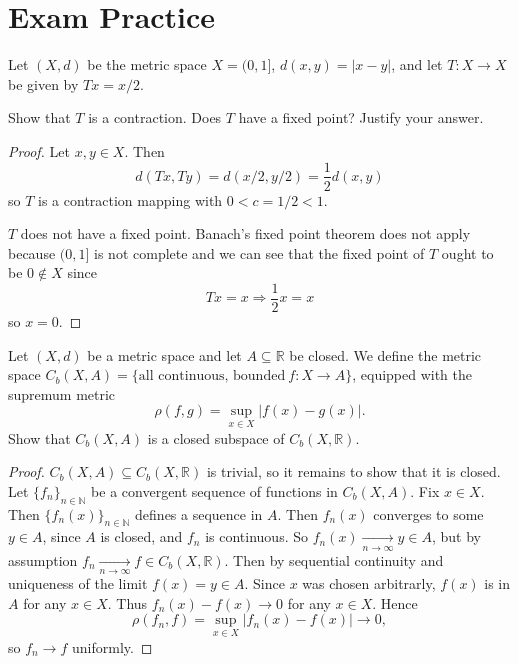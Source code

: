\newpage 
\section{Exam Practice}

\begin{prob}[1 Exam 2021]
    Let $(X,d)$ be the metric space $X = (0,1]$, $d(x,y) = |x-y|$, 
    and let $T : X \to X$ be given by $Tx = x/2$.

    Show that $T$ is a contraction. Does $T$ have a fixed point? 
    Justify your answer.
\end{prob}
\begin{proof}
    Let $x,y \in X$. Then 
    \[ 
        d(Tx,Ty) = d(x/2, y/2) = \frac{1}{2}d(x,y)
    \]
    so $T$ is a contraction mapping with $0 < c = 1/2 < 1$.

    $T$ does not have a fixed point. Banach's fixed point theorem 
    does not apply because $(0,1]$ is not complete and we can 
    see that the fixed point of $T$ ought to be $0 \not\in X$ since 
    \[
        Tx = x \Rightarrow \frac{1}{2}x = x
    \]
    so $x = 0$.
\end{proof}

\begin{prob}[2 Exam 2021]
    Let $(X,d)$ be a metric space and let $A \subseteq \mathbb R$
    be closed. 
    We define the metric space $C_b(X, A) = \{\text{all continuous,
    bounded}\ f : X \to A\}$, equipped with the supremum metric 
    \[
        \rho(f,g) = \sup_{x\in X}|f(x) - g(x)|.
    \]
    Show that $C_b(X,A)$ is a closed subspace of $C_b(X,\mathbb R)$.
\end{prob}
\begin{proof}
    $C_b(X,A) \subseteq C_b(X,\mathbb R)$ is trivial, so it 
    remains to show that it is closed.
    Let $\{f_n\}_{n\in\mathbb N}$ be a convergent sequence of 
    functions 
    in $C_b(X,A)$.
    Fix $x \in X$. Then $\{f_n(x)\}_{n\in\mathbb N}$ defines a 
    sequence in $A$. Then 
    $f_n(x)$ converges to some $y \in A$, since $A$ is closed, 
    and $f_n$ is continuous. So 
    $f_n(x) \underset{n\to\infty}{\to} y \in A$, but 
    by assumption $f_n \underset{n\to\infty}{\to} f \in 
    C_b(X,\mathbb R)$. Then by sequential continuity and 
    uniqueness of the limit
    $f(x) = y \in A$. Since $x$ was chosen arbitrarly, 
    $f(x)$ is in $A$ for any $x \in X$. Thus 
    $f_n(x) - f(x) \to 0$ for any $x \in X$. Hence 
    \[
        \rho(f_n,f) = \sup_{x\in X}|f_n(x) - f(x)| \to 0,
    \]
    so $f_n \to f$ uniformly.
\end{proof}

